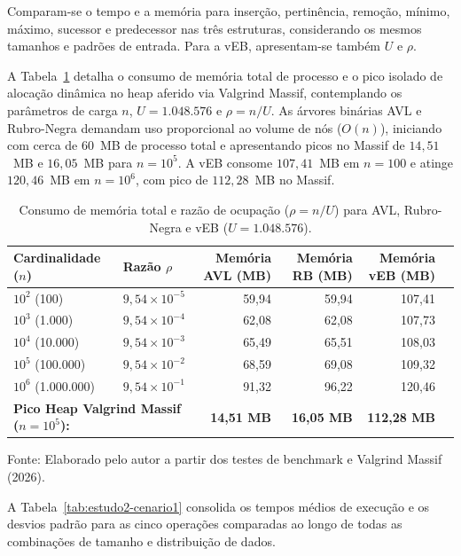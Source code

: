 \documentclass[12pt,a4paper]{report}
\begin{document}
Comparam-se o tempo e a memória para inserção, pertinência, remoção, mínimo, máximo, sucessor e predecessor nas três estruturas, considerando os mesmos tamanhos e padrões de entrada. Para a vEB, apresentam-se também $U$ e $\rho$.

A Tabela~\ref{tab:estudo2-cenario1-memoria} detalha o consumo de memória total de processo e o pico isolado de alocação dinâmica no heap aferido via Valgrind Massif, contemplando os parâmetros de carga $n$, $U = 1.048.576$ e $\rho = n/U$. As árvores binárias AVL e Rubro-Negra demandam uso proporcional ao volume de nós ($O(n)$), iniciando com cerca de $60$~MB de processo total e apresentando picos no Massif de $14{,}51$~MB e $16{,}05$~MB para $n = 10^5$. A vEB consome $107{,}41$~MB em $n = 100$ e atinge $120{,}46$~MB em $n = 10^6$, com pico de $112{,}28$~MB no Massif.

\begin{table}[htbp]
  \centering
  \caption{Consumo de memória total e razão de ocupação ($\rho = n/U$) para AVL, Rubro-Negra e vEB ($U = 1.048.576$).}
  \label{tab:estudo2-cenario1-memoria}
  \small
  \begin{tabular}{llrrrr}
    \toprule
    \textbf{Cardinalidade ($n$)} & \textbf{Razão $\rho$} & \textbf{Memória AVL (MB)} & \textbf{Memória RB (MB)} & \textbf{Memória vEB (MB)} \\
    \midrule
    $10^2$ (100) & $9{,}54 \times 10^{-5}$ & 59,94 & 59,94 & 107,41 \\
    $10^3$ (1.000) & $9{,}54 \times 10^{-4}$ & 62,08 & 62,08 & 107,73 \\
    $10^4$ (10.000) & $9{,}54 \times 10^{-3}$ & 65,49 & 65,51 & 108,03 \\
    $10^5$ (100.000) & $9{,}54 \times 10^{-2}$ & 68,59 & 69,08 & 109,32 \\
    $10^6$ (1.000.000) & $9{,}54 \times 10^{-1}$ & 91,32 & 96,22 & 120,46 \\
    \midrule
    \multicolumn{2}{l}{\textbf{Pico Heap Valgrind Massif ($n=10^5$):}} & \textbf{14,51 MB} & \textbf{16,05 MB} & \textbf{112,28 MB} \\
    \bottomrule
  \end{tabular}
  \vspace{0.2cm}
  
  \raggedright\footnotesize Fonte: Elaborado pelo autor a partir dos testes de benchmark e Valgrind Massif (2026).
\end{table}

A Tabela~\ref{tab:estudo2-cenario1} consolida os tempos médios de execução e os desvios padrão para as cinco operações comparadas ao longo de todas as combinações de tamanho e distribuição de dados.
\end{document}
